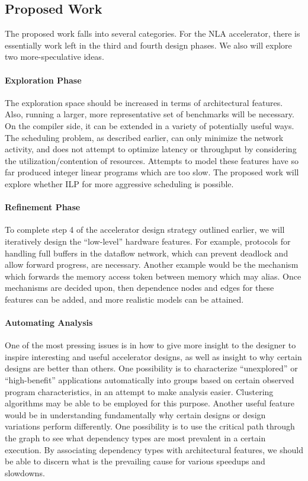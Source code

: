 \subsection{Proposed Work} The proposed work falls into several categories.
For the NLA accelerator, there is essentially work left in the
third and fourth design phases.  We also will explore two more-speculative ideas.

\paragraph{Exploration Phase} The exploration space should be increased in terms of
architectural features.  Also, running a larger, more representative set of
benchmarks will be necessary.  On the compiler side, it can be extended in a
variety of potentially useful ways.  The scheduling problem, as described
earlier, can only minimize the network activity, and
 does not attempt to optimize latency or throughput by considering the
utilization/contention of resources.  Attempts to model these features
have so far produced integer linear programs which are too slow.  The
proposed work will explore whether ILP for more aggressive scheduling is
possible.

\paragraph{Refinement Phase} 
To complete step 4 of the accelerator design strategy outlined earlier,
we will iteratively design the ``low-level'' hardware features.  
For example, protocols for handling full buffers in the dataflow 
network, which can prevent deadlock and allow forward progress, are necessary.  Another
example would be the mechanism which forwards the memory access token between
memory which may alias.  Once mechanisms are decided upon, then dependence nodes
and edges for these features can be added, and more realistic models can be attained.

\paragraph{Automating Analysis}
One of the most pressing issues is in how to give more insight to the designer 
to inspire interesting and useful accelerator designs, as well as insight to why
certain designs are better than others.  One possibility is to characterize 
``unexplored'' or ``high-benefit'' applications automatically into groups based on
certain observed program characteristics, in an attempt to make analysis easier.  
Clustering algorithms may be able to be employed for this purpose.  
Another useful feature would be in understanding fundamentally why certain designs
or design variations perform differently.  One possibility is to use the critical
path through the graph to see what dependency types are most prevalent in a certain
execution.  By associating dependency types with architectural features, we should be
able to discern what is the prevailing cause for various speedups and slowdowns.

